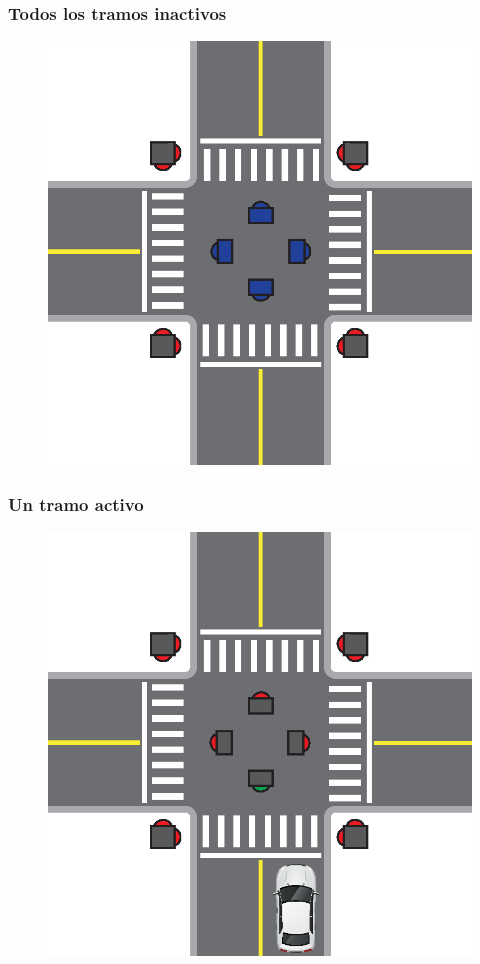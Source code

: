 \begin{frame}
\frametitle{Todos los tramos inactivos}
	\begin{figure}[htbp]
		\centering
		\includegraphics[scale=\tamInterseccion]{diagramas/ningun-activo.eps}
	\end{figure}
\end{frame}

\begin{frame}
\frametitle{Un tramo activo}
\begin{figure}[htbp]
	\centering
	\includegraphics[scale=\tamInterseccion]{diagramas/un-activo.eps}
\end{figure}
\end{frame}

